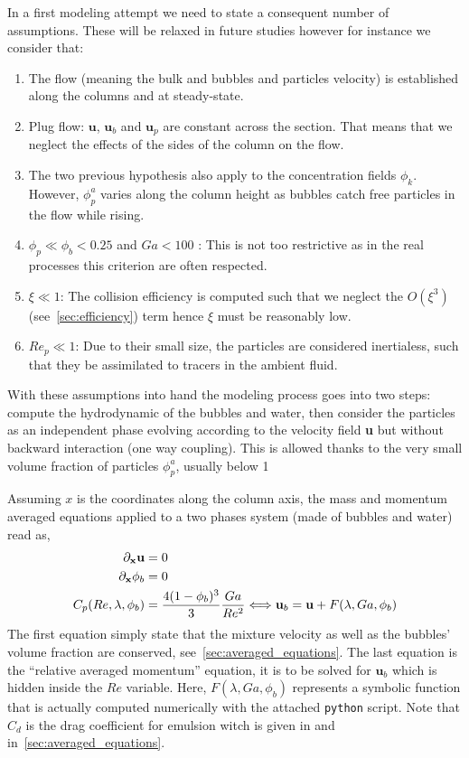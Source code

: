 In a first modeling attempt we need to state a consequent number of assumptions. 
These will be relaxed in future studies however for instance we consider that:
\begin{enumerate}
    \item The flow (meaning the bulk and bubbles and particles velocity) is established along the columns and at steady-state.
    \item Plug flow: $\textbf{u}$, $\textbf{u}_b$ and $\textbf{u}_p$ are constant across the section. That means that we neglect the effects of the sides of the column on the flow.
    \item The two previous hypothesis also apply to the concentration fields $\phi_k$. 
    However, $\phi^a_p$ varies along the column height as bubbles catch free particles in the flow while rising. 
    \item $\phi_p\ll \phi_b<0.25$ and $Ga<100$ : This is not too restrictive as in the real processes this criterion are often respected. 
    \item $\xi \ll 1$: The collision efficiency is computed such that we neglect the $O(\xi^3)$ (see~\ref{sec:efficiency}) term hence $\xi$ must be reasonably low. 
    \item $Re_p\ll 1$: Due to their small size, the particles are considered inertialess, such that they be assimilated to tracers in the ambient fluid. 
\end{enumerate}

With these assumptions into hand the modeling process goes into two steps: compute the hydrodynamic of the bubbles and water, then consider the particles as an independent phase evolving according to the velocity field \textbf{u} but without backward interaction (one way coupling). 
This is allowed thanks to the very small volume fraction of particles $\phi_p^a$, usually below 1~\textperthousand{}

Assuming $x$ is the coordinates along the column axis, the mass and momentum averaged equations applied to a two phases system (made of bubbles and water) read as, 
\begin{align}
    \label{eq:divu_zero}
    \pddx \textbf{u} &= 0 \\
    \pddx \phi_b &= 0 \\
    \label{eq:ur}
    C_p(Re,\lambda,\phi_b) &= \frac{4(1-\phi_b)^3}{3}\frac{Ga}{Re^2} \Longleftrightarrow  \textbf{u}_b = \textbf{u}  + F(\lambda , Ga, \phi_b)
\end{align}
The first equation simply state that the mixture velocity as well as the bubbles' volume fraction are conserved, see~\ref{sec:averaged_equations}. 
The last equation is the ``relative averaged momentum'' equation, it is to be solved for $\textbf{u}_b$ which is hidden inside the $Re$ variable. 
Here, $F(\lambda,Ga,\phi_b)$ represents a symbolic function that is actually computed numerically with the attached \texttt{python} script. 
Note that $C_d$ is the drag coefficient for emulsion witch is given in \citet[Chapter 8]{fintzi2025} and in~\ref{sec:averaged_equations}.


